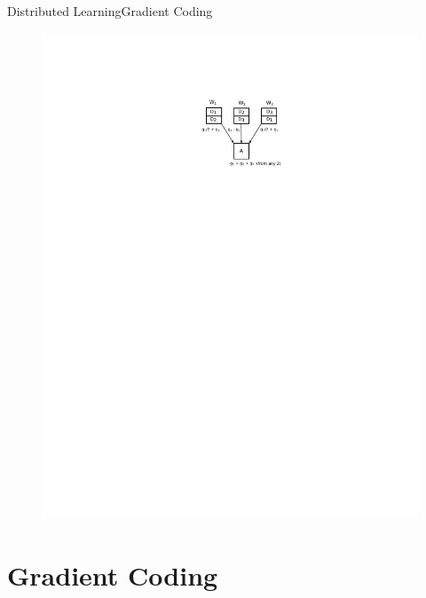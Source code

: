 \documentclass{beamer}
\begin{document}
\begin{frame}{Distributed Learning}{Gradient Coding}

\begin{figure}
    \centering
    \includegraphics[height=.7\textheight]{res/gradient coding.pdf}
\end{figure}

\end{frame}

\section{Gradient Coding}

                
\end{document}
